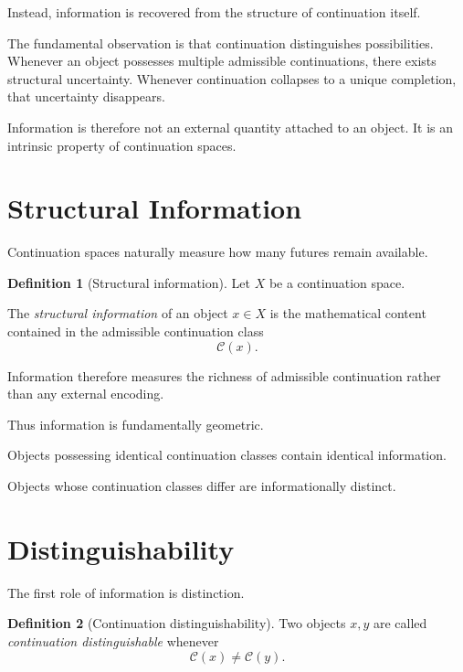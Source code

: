 \documentclass[13pt,openany]{book}
\theoremstyle{plain}
\theoremstyle{definition}
\newtheorem{definition}{Definition}[chapter]
\begin{document}
Instead, information is recovered from the structure of continuation itself.

The fundamental observation is that continuation distinguishes possibilities.
Whenever an object possesses multiple admissible continuations, there exists
structural uncertainty. Whenever continuation collapses to a unique completion,
that uncertainty disappears.

Information is therefore not an external quantity attached to an object.
It is an intrinsic property of continuation spaces.

\section{Structural Information}

Continuation spaces naturally measure how many futures remain available.

\begin{definition}[Structural information]
Let \(X\) be a continuation space.

The \emph{structural information} of an object \(x\in X\) is the mathematical
content contained in the admissible continuation class
\[
\mathcal C(x).
\]

Information therefore measures the richness of admissible continuation rather
than any external encoding.
\end{definition}

Thus information is fundamentally geometric.

Objects possessing identical continuation classes contain identical information.

Objects whose continuation classes differ are informationally distinct.

\section{Distinguishability}

The first role of information is distinction.

\begin{definition}[Continuation distinguishability]
Two objects \(x,y\) are called
\emph{continuation distinguishable}
whenever
\[
\mathcal C(x)\neq\mathcal C(y).
\]
\end{definition}
\end{document}
